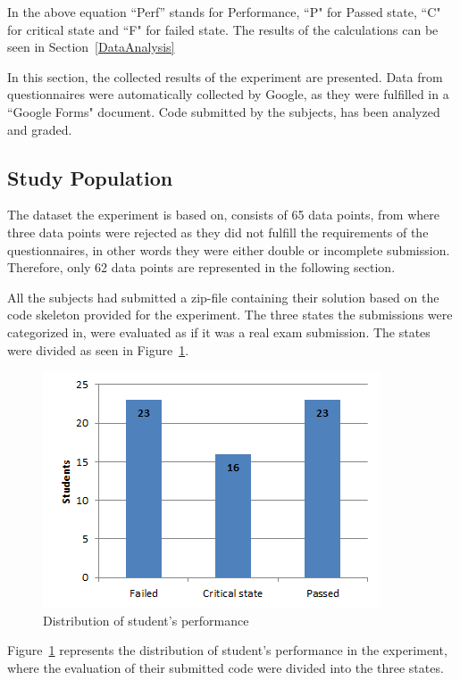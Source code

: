 \documentclass{sig-alternate-05-2015}
\begin{document}
In the above equation ``Perf'' stands for Performance, ``P" for Passed state, ``C" for critical state and ``F" for failed state. 
The results of the calculations can be seen in Section~\ref{DataAnalysis}

\label{sec:Results}
In this section, the collected results of the experiment are presented. Data from questionnaires were automatically collected by Google, as they were fulfilled in a ``Google Forms" document. Code submitted by the subjects, has been analyzed and graded.

\subsection{Study Population}
\label{DemograpichInformation}
The dataset the experiment is based on, consists of 65 data points, from where three data points were rejected as they did not fulfill the requirements of the questionnaires, in other words they were either double or incomplete submission. Therefore, only 62 data points are represented in the following section.

All the subjects had submitted a zip-file containing their solution based on the code skeleton provided for the experiment. The three states the submissions were categorized in, were evaluated as if it was a real exam submission.
The states were divided as seen in Figure~\ref{fig:DistributionOfStudentPerformance}.

\begin{figure}[!ht]
	\centering
	\includegraphics[width=1\linewidth]{img01}
	\caption{Distribution of student's performance}
	\label{fig:DistributionOfStudentPerformance}
\end{figure}
Figure~\ref{fig:DistributionOfStudentPerformance} represents the distribution of student's performance in the experiment, where the evaluation of their submitted code were divided into the three states.\\
\end{document}
